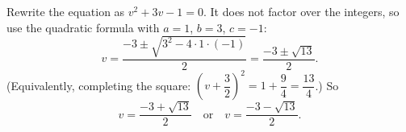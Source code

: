 Rewrite the equation as $v^2+3v-1=0$. It does not factor over the integers, so use the quadratic formula with $a=1$, $b=3$, $c=-1$:
\[
v=\dfrac{-3\pm\sqrt{3^2-4\cdot1\cdot(-1)}}{2}=\dfrac{-3\pm\sqrt{13}}{2}.
\]
(Equivalently, completing the square: $\left(v+\dfrac{3}{2}\right)^2=1+\dfrac{9}{4}=\dfrac{13}{4}$.) So
\[
\boxed{v=\dfrac{-3+\sqrt{13}}{2}\quad\text{or}\quad v=\dfrac{-3-\sqrt{13}}{2}}.
\]
